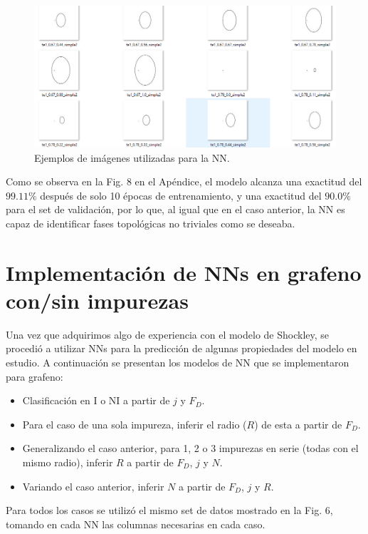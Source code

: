 \documentclass{article}
\begin{document}
\begin{figure}[th!]
\centering
   \includegraphics[width=1.\textwidth]{imagenes_shockley.png}
   \caption{Ejemplos de imágenes utilizadas para la NN.}
\end{figure}

Como se observa en la Fig. 8 en el Apéndice, el modelo alcanza una exactitud del $99.11\%$ después de solo 10 épocas de entrenamiento, y una exactitud del $90.0\%$ para el set de validación, por lo que, al igual que en el caso anterior, la NN es capaz de identificar fases topológicas no triviales como se deseaba.

\section{Implementación de NNs en grafeno con/sin impurezas}
Una vez que adquirimos algo de experiencia con el modelo de Shockley, se procedió a utilizar NNs para la predicción de algunas propiedades del modelo en estudio. A continuación se presentan los modelos de NN que se implementaron para grafeno:
\begin{itemize}
    \item Clasificación en I o NI a partir de $j$ y $F_D$.
    \item Para el caso de una sola impureza, inferir el radio ($R$) de esta a partir de $F_D$.
    \item Generalizando el caso anterior, para 1, 2 o 3 impurezas en serie (todas con el mismo radio), inferir $R$ a partir de $F_D$, $j$ y $N$.
    \item Variando el caso anterior,  inferir $N$ a partir de $F_D$, $j$ y $R$.
\end{itemize}

Para todos los casos se utilizó el mismo set de datos mostrado en la Fig. 6, tomando en cada NN las columnas necesarias en cada caso.
\end{document}

